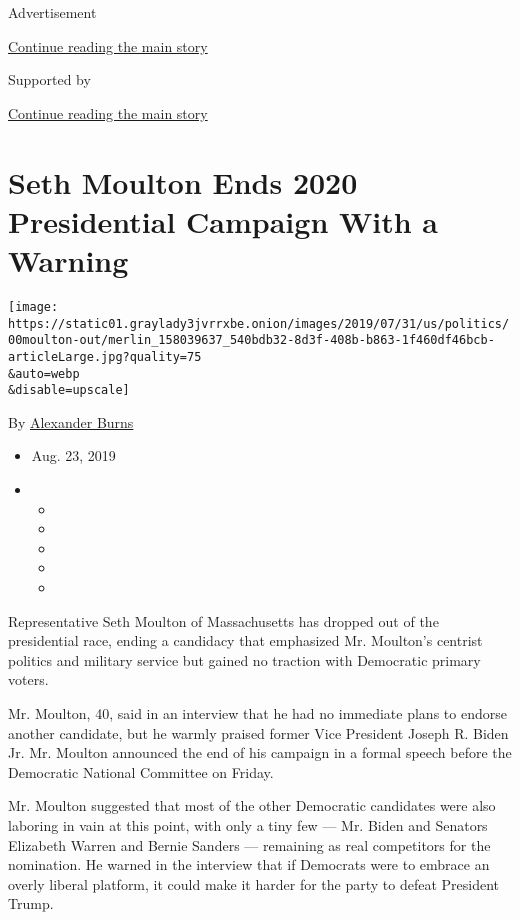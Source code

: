 Advertisement

\protect\hyperlink{after-top}{Continue reading the main story}

Supported by

\protect\hyperlink{after-sponsor}{Continue reading the main story}

\hypertarget{seth-moulton-ends-2020-presidential-campaign-with-a-warning}{%
\section{Seth Moulton Ends 2020 Presidential Campaign With a
Warning}\label{seth-moulton-ends-2020-presidential-campaign-with-a-warning}}

\texttt{[image: https://static01.graylady3jvrrxbe.onion/images/2019/07/31/us/politics/00moulton-out/merlin\_158039637\_540bdb32-8d3f-408b-b863-1f460df46bcb-articleLarge.jpg?quality=75\\\&auto=webp\\\&disable=upscale]}

By
\href{https://www.nytimes3xbfgragh.onion/by/alexander-burns}{Alexander
Burns}

\begin{itemize}
\item
  Aug. 23, 2019
\item
  \begin{itemize}
  \item
  \item
  \item
  \item
  \item
  \end{itemize}
\end{itemize}

Representative Seth Moulton of Massachusetts has dropped out of the
presidential race, ending a candidacy that emphasized Mr. Moulton's
centrist politics and military service but gained no traction with
Democratic primary voters.

Mr. Moulton, 40, said in an interview that he had no immediate plans to
endorse another candidate, but he warmly praised former Vice President
Joseph R. Biden Jr. Mr. Moulton announced the end of his campaign in a
formal speech before the Democratic National Committee on Friday.

Mr. Moulton suggested that most of the other Democratic candidates were
also laboring in vain at this point, with only a tiny few --- Mr. Biden
and Senators Elizabeth Warren and Bernie Sanders --- remaining as real
competitors for the nomination. He warned in the interview that if
Democrats were to embrace an overly liberal platform, it could make it
harder for the party to defeat President Trump.

